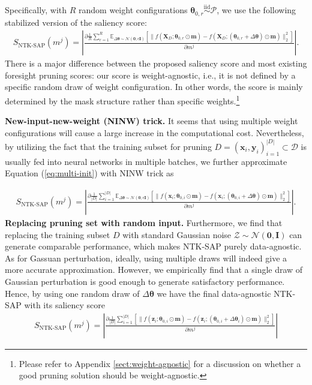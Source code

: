 \documentclass{article} %
\begin{document}
Specifically, with $R$ random weight configurations $\boldsymbol{\theta}_{0,r} \overset{\mathrm{iid}}{\sim} \mathcal{P}$, we use the following stabilized version of the saliency score: 
\begin{align}
    S_{\text{NTK-SAP}}(m^j)
= \left|\frac{\partial \frac{1}{R} \sum_{r=1}^R \mathbb{E}_{\Delta \boldsymbol{\theta} \sim \mathcal{N}(\textbf{0},\epsilon\textbf{I})}\left[\|f(\mathbf{X}_D;\boldsymbol{\theta}_{0,r}\odot \textbf{m})-f(\mathbf{X}_D;(\boldsymbol{\theta}_{0,r}+\Delta\boldsymbol{\theta})\odot \textbf{m})\|_2^2\right]}{\partial m^j}\right|. \label{eq:multi-init}
\end{align} 
There is a major difference between the proposed saliency score and most existing foresight pruning scores: our score is weight-agnostic, i.e., it is not defined by a specific random draw of weight configuration.
In other words, the score is mainly determined by the mask structure 
rather than specific weights.\footnote{Please refer to Appendix \ref{sect:weight-agnostic} for a discussion on whether a good pruning solution should be weight-agnostic.}

\textbf{New-input-new-weight (NINW) trick.} It seems that using multiple weight configurations will cause a large increase in the computational cost.
Nevertheless, by utilizing the fact that the training subset for pruning $D = {(\mathbf{x}_i,\mathbf{y}_i)}_{i=1}^{|D|} \subset \mathcal{D}$ is usually fed into neural networks in multiple batches, we further approximate Equation (\ref{eq:multi-init}) with NINW trick as

\begin{align}
    S_{\text{NTK-SAP}}(m^j)
= \left|\frac{\partial \frac{1}{|D|} \sum_{i=1}^{|D|} \mathbb{E}_{\Delta \boldsymbol{\theta} \sim \mathcal{N}(\textbf{0},\epsilon\textbf{I})}\left[\|f(\mathbf{x}_{i};\boldsymbol{\theta}_{0,i}\odot \textbf{m})-f(\mathbf{x}_{i};(\boldsymbol{\theta}_{0,i}+\Delta\boldsymbol{\theta})\odot \textbf{m})\|_2^2\right]}{\partial m^j}\right|. \label{eq:multi-init-in-data}
\end{align} 
\textbf{Replacing pruning set with random input.} Furthermore, we find that replacing the training subset $D$ with standard Gaussian noise $\mathcal{Z}\sim \mathcal{N}(\textbf{0},\textbf{I})$ can generate comparable performance, which makes NTK-SAP purely data-agnostic. As for Gassuan perturbation, ideally, using multiple draws will indeed give a more accurate approximation. However, we empirically find that a single draw of Gaussian perturbation is good enough to generate satisfactory performance. Hence, by using one random draw of $\Delta \boldsymbol{\theta}$ we have the final data-agnostic NTK-SAP with its saliency score
\begin{align}
    S_{\text{NTK-SAP}}(m^j)
= \left|\frac{\partial \frac{1}{|D|} \sum_{i=1}^{|D|} \left[\|f(\mathbf{z}_{i};\boldsymbol{\theta}_{0,i}\odot \textbf{m})-f(\mathbf{z}_{i};(\boldsymbol{\theta}_{0,i}+\Delta\boldsymbol{\theta}_{i})\odot \textbf{m})\|_2^2\right]}{\partial m^j}\right| \label{eq:multi-init-final}
\end{align} 
\end{document}
